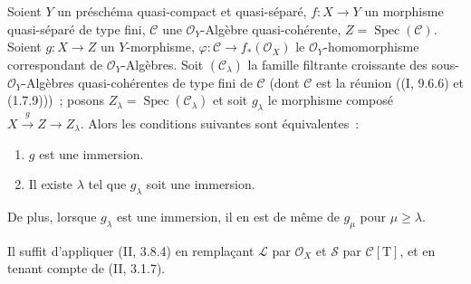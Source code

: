 \begin{lemma}[8.12.2]
\label{IV.8.12.2-fr}
Soient $Y$ un préschéma quasi-compact et quasi-séparé, $f:X\to Y$ un
morphisme quasi-séparé de type fini, $\mathcal C$ une $\mathcal O_Y$-Algèbre
quasi-cohérente, $Z=\operatorname{Spec}(\mathcal C)$. Soient $g:X\to Z$ un
$Y$-morphisme, $\varphi:\mathcal C\to f_*(\mathcal O_X)$ le
$\mathcal O_Y$-homomorphisme correspondant de $\mathcal O_Y$-Algèbres. Soit
$(\mathcal C_\lambda)$ la famille filtrante croissante des sous-$\mathcal O_Y$-Algèbres
quasi-cohérentes de type fini de $\mathcal C$ (dont $\mathcal C$ est la
réunion ((I, 9.6.6) et (1.7.9)))~; posons
$Z_\lambda=\operatorname{Spec}(\mathcal C_\lambda)$ et soit $g_\lambda$ le
morphisme composé $X\xrightarrow{g}Z\to Z_\lambda$. Alors les conditions
suivantes sont équivalentes~:
\begin{enumerate}
\item[\emph{a)}] $g$ est une immersion.
\item[\emph{b)}] Il existe $\lambda$ tel que $g_\lambda$ soit une immersion.
\end{enumerate}
De plus, lorsque $g_\lambda$ est une immersion, il en est de même de $g_\mu$
pour $\mu\geq\lambda$.

Il suffit d'appliquer (II, 3.8.4) en remplaçant $\mathcal L$ par
$\mathcal O_X$ et $\mathcal S$ par $\mathcal C[\mathrm T]$, et en tenant
compte de (II, 3.1.7).
\end{lemma}

